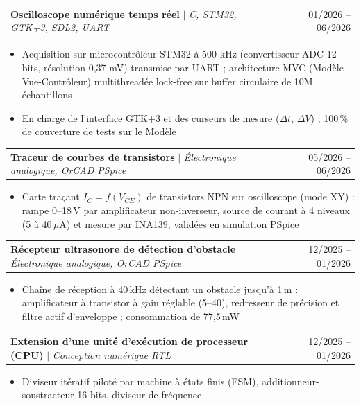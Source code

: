 \documentclass[a4paper,10pt]{article}
\makeatletter
\newcommand{\resumeItem}[1]{
  \item\small{
    {#1 \vspace{-2pt}}
  }
}
\newcommand{\resumeProjectHeading}[2]{
    \item
    \begin{tabular*}{0.97\textwidth}{
      l@{\extracolsep{\fill}}r
    }
      \small#1 & #2 \\
    \end{tabular*}\vspace{-7pt}
}
\newcommand{\resumeItemListStart}{
  \vspace{2pt}\begin{itemize}[label=\textbullet]
}
\newcommand{\resumeItemListEnd}{
  \end{itemize}\vspace{-5pt}
}
\makeatother
\begin{document}
    \resumeProjectHeading
      {
        \textbf{
          \href{https://github.com/EfeCaginYildirim/projet_pmnd}
          {\underline{Oscilloscope numérique temps réel}}
        }
        $|$ \emph{C, STM32, GTK+3, SDL2, UART}
      }
      {01/2026 -- 06/2026}

      \resumeItemListStart
        \resumeItem{
          Acquisition sur microcontrôleur STM32 à 500 kHz (convertisseur ADC 12 bits, résolution 0,37 mV)
          transmise par UART ; architecture MVC (Modèle-Vue-Contrôleur) multithreadée lock-free
          sur buffer circulaire de 10M échantillons
        }
        \resumeItem{
          En charge de l'interface GTK+3 et des curseurs de mesure ($\Delta t$, $\Delta V$) ;
          100\,\% de couverture de tests sur le Modèle
        }
      \resumeItemListEnd
      \vspace{6pt}

    \resumeProjectHeading
      {
        \textbf{Traceur de courbes de transistors}
        $|$ \emph{Électronique analogique, OrCAD PSpice}
      }
      {05/2026 -- 06/2026}

      \resumeItemListStart
        \resumeItem{
          Carte traçant $I_C = f(V_{CE})$ de transistors NPN sur oscilloscope (mode XY) :
          rampe 0--18\,V par amplificateur non-inverseur, source de courant à 4 niveaux
          (5 à 40\,$\mu$A) et mesure par INA139, validées en simulation PSpice
        }
      \resumeItemListEnd
      \vspace{6pt}

    \resumeProjectHeading
      {
        \textbf{Récepteur ultrasonore de détection d'obstacle}
        $|$ \emph{Électronique analogique, OrCAD PSpice}
      }
      {12/2025 -- 01/2026}

      \resumeItemListStart
        \resumeItem{
          Chaîne de réception à 40\,kHz détectant un obstacle jusqu'à 1\,m :
          amplificateur à transistor à gain réglable (5--40), redresseur de précision
          et filtre actif d'enveloppe ; consommation de 77,5\,mW
        }
      \resumeItemListEnd
      \vspace{6pt}

    \resumeProjectHeading
      {
        \textbf{Extension d'une unité d'exécution de processeur (CPU)}
        $|$ \emph{Conception numérique RTL}
      }
      {12/2025 -- 01/2026}

      \resumeItemListStart
        \resumeItem{
          Diviseur itératif piloté par machine à états finis (FSM), additionneur-soustracteur 16 bits,
          diviseur de fréquence
        }
      \resumeItemListEnd
\end{document}
